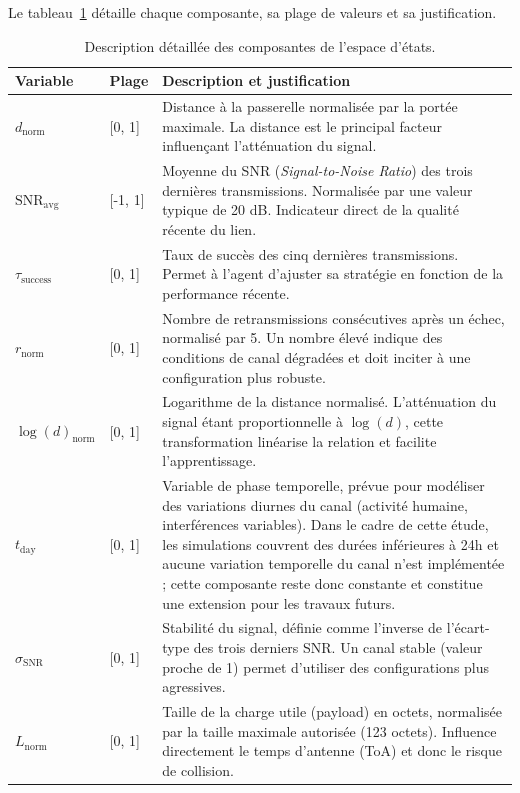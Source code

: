Le tableau~\ref{tab:state-space-ddqn} détaille chaque composante, sa plage de valeurs et sa justification.

\begin{table}[!ht]
	\centering
	\caption{Description détaillée des composantes de l'espace d'états.}
	\label{tab:state-space-ddqn}
	\begin{tabular}{|p{2.5cm}|p{2cm}|p{8cm}|}
		\hline
		\textbf{Variable} & \textbf{Plage} & \textbf{Description et justification} \\
		\hline
		$d_{\text{norm}}$ & [0, 1] & Distance à la passerelle normalisée par la portée maximale. La distance est le principal facteur influençant l'atténuation du signal. \\
		\hline
		$\text{SNR}_{\text{avg}}$ & [-1, 1] & Moyenne du SNR (\textit{Signal-to-Noise Ratio}) des trois dernières transmissions. Normalisée par une valeur typique de 20 dB. Indicateur direct de la qualité récente du lien. \\
		\hline
		$\tau_{\text{success}}$ & [0, 1] & Taux de succès des cinq dernières transmissions. Permet à l'agent d'ajuster sa stratégie en fonction de la performance récente. \\
		\hline
		$r_{\text{norm}}$ & [0, 1] & Nombre de retransmissions consécutives après un échec, normalisé par 5. Un nombre élevé indique des conditions de canal dégradées et doit inciter à une configuration plus robuste. \\
		\hline
		$\log(d)_{\text{norm}}$ & [0, 1] & Logarithme de la distance normalisé. L'atténuation du signal étant proportionnelle à $\log(d)$, cette transformation linéarise la relation et facilite l'apprentissage. \\
		\hline
		$t_{\text{day}}$ & [0, 1] & Variable de phase temporelle, prévue pour modéliser des variations diurnes du canal (activité humaine, interférences variables). Dans le cadre de cette étude, les simulations couvrent des durées inférieures à 24h et aucune variation temporelle du canal n'est implémentée ; cette composante reste donc constante et constitue une extension pour les travaux futurs.  \\
		\hline
		$\sigma_{\text{SNR}}$ & [0, 1] & Stabilité du signal, définie comme l'inverse de l'écart-type des trois derniers SNR. Un canal stable (valeur proche de 1) permet d'utiliser des configurations plus agressives. \\
		\hline
		$L_{\text{norm}}$ & [0, 1] & Taille de la charge utile (payload) en octets, normalisée par la taille maximale autorisée (123 octets). Influence directement le temps d'antenne (ToA) et donc le risque de collision. \\
		\hline
	\end{tabular}
\end{table}

